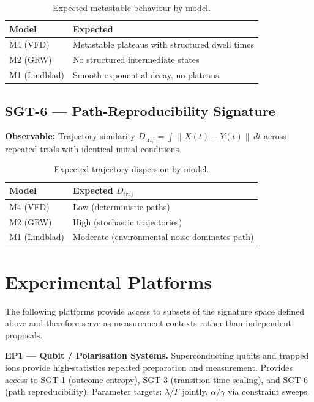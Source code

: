\documentclass[12pt]{article}
\begin{document}
\begin{table}[ht]
\centering
\caption{Expected metastable behaviour by model.}
\begin{tabular}{@{}ll@{}}
\toprule
Model & Expected \\
\midrule
M4 (VFD) & Metastable plateaus with structured dwell times \\
M2 (GRW) & No structured intermediate states \\
M1 (Lindblad) & Smooth exponential decay, no plateaus \\
\bottomrule
\end{tabular}
\end{table}

\subsection{SGT-6 --- Path-Reproducibility Signature}

\textbf{Observable:} Trajectory similarity $D_{\mathrm{traj}} = \int \|X(t) - Y(t)\|\, dt$ across repeated trials with identical initial conditions.

\begin{table}[ht]
\centering
\caption{Expected trajectory dispersion by model.}
\begin{tabular}{@{}ll@{}}
\toprule
Model & Expected $D_{\mathrm{traj}}$ \\
\midrule
M4 (VFD) & Low (deterministic paths) \\
M2 (GRW) & High (stochastic trajectories) \\
M1 (Lindblad) & Moderate (environmental noise dominates path) \\
\bottomrule
\end{tabular}
\end{table}

\section{Experimental Platforms}
\label{sec:platforms}

The following platforms provide access to subsets of the signature space defined above and therefore serve as measurement contexts rather than independent proposals.

\textbf{EP1 --- Qubit / Polarisation Systems.} Superconducting qubits and trapped ions provide high-statistics repeated preparation and measurement. Provides access to SGT-1 (outcome entropy), SGT-3 (transition-time scaling), and SGT-6 (path reproducibility). Parameter targets: $\lambda/\Gamma$ jointly, $\alpha/\gamma$ via constraint sweeps.
\end{document}
